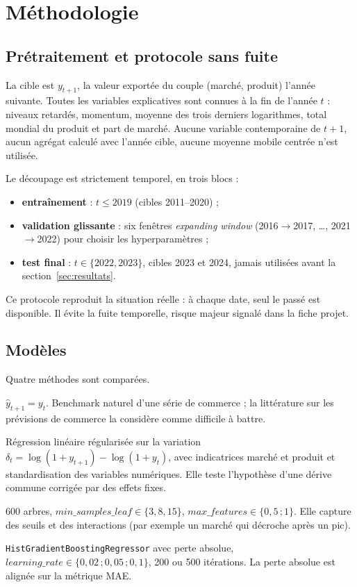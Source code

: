 \documentclass[11pt,a4paper]{article}
\begin{document}
\section{Méthodologie}\label{sec:method}

\subsection{Prétraitement et protocole sans fuite}

La cible est $y_{t+1}$, la valeur exportée du couple (marché, produit) l'année
suivante. Toutes les variables explicatives sont connues à la fin de l'année
$t$ : niveaux retardés, momentum, moyenne des trois derniers logarithmes, total
mondial du produit et part de marché. Aucune variable contemporaine de $t+1$,
aucun agrégat calculé avec l'année cible, aucune moyenne mobile centrée
n'est utilisée.

Le découpage est strictement temporel, en trois blocs :

\begin{itemize}[leftmargin=1.2cm]
\item \textbf{entraînement} : $t \leq 2019$ (cibles 2011--2020) ;
\item \textbf{validation glissante} : six fenêtres \emph{expanding window}
      (2016$\to$2017, \dots, 2021$\to$2022) pour choisir les hyperparamètres ;
\item \textbf{test final} : $t \in \{2022, 2023\}$, cibles 2023 et 2024,
      jamais utilisées avant la section~\ref{sec:resultats}.
\end{itemize}

Ce protocole reproduit la situation réelle : à chaque date, seul le passé est
disponible. Il évite la fuite temporelle, risque majeur signalé dans la fiche
projet.

\subsection{Modèles}

Quatre méthodes sont comparées.

\begin{description}[leftmargin=1.2cm,style=nextline]
\item[Persistance (référence).] $\hat y_{t+1} = y_t$. Benchmark naturel d'une
série de commerce ; la littérature sur les prévisions de commerce la considère
comme difficile à battre.
\item[Ridge.] Régression linéaire régularisée sur la variation
$\delta_t = \log(1+y_{t+1}) - \log(1+y_t)$, avec indicatrices marché et produit
et standardisation des variables numériques. Elle teste l'hypothèse d'une
dérive commune corrigée par des effets fixes.
\item[Forêt aléatoire.] 600 arbres, $min\_samples\_leaf \in \{3,8,15\}$,
$max\_features \in \{0,5\,;1\}$. Elle capture des seuils et des interactions
(par exemple un marché qui décroche après un pic).
\item[Gradient boosting.] \texttt{HistGradientBoostingRegressor} avec perte
absolue, $learning\_rate \in \{0,02\,;0,05\,;0,1\}$, 200 ou 500 itérations.
La perte absolue est alignée sur la métrique MAE.
\end{description}
\end{document}
